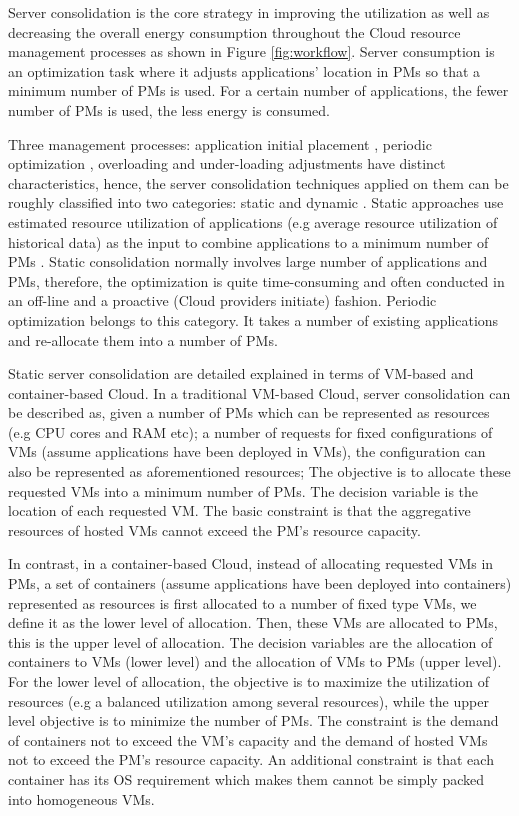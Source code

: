 Server consolidation \cite{Varasteh:2015fu} is the core strategy in improving the utilization as well as decreasing the overall energy consumption throughout the Cloud resource management processes as shown in Figure \ref{fig:workflow}. Server consumption is an optimization task where it adjusts applications' location in PMs so that a minimum number of PMs is used. For a certain number of applications, the fewer number of PMs is used, the less energy is consumed. 

Three management processes: application initial placement \cite{Jennings:2015ht}, periodic optimization \cite{Mishra:2012kx}, overloading and under-loading adjustments \cite{Mishra:2012kx} have distinct characteristics, hence, the server consolidation techniques applied on them can be roughly classified into two categories: static \cite{Xiao:2015ik} and dynamic \cite{Beloglazov:2012bw}.
Static approaches use estimated resource utilization of applications (e.g average resource utilization of historical data) as the input to combine applications to a minimum number of PMs \cite{Mishra:2012kx}. Static consolidation normally involves large number of applications and PMs, therefore, the optimization is quite time-consuming and often conducted in an off-line and a proactive (Cloud providers initiate) fashion. Periodic optimization belongs to this category. It takes a number of existing applications and re-allocate them into a number of PMs. 

Static server consolidation are detailed explained in terms of VM-based and container-based Cloud. In a traditional VM-based Cloud, server consolidation can be described as, given a number of  PMs which can be represented as resources (e.g CPU cores and RAM etc); a number of requests for fixed configurations of VMs (assume applications have been deployed in VMs), the configuration can also be represented as aforementioned resources; The objective is to allocate these requested VMs into a minimum number of PMs. The decision variable is the location of each requested VM. The basic constraint is that the aggregative resources  of hosted VMs cannot exceed the PM's resource capacity. 

In contrast, in a container-based Cloud, instead of allocating requested VMs in PMs, a set of containers (assume applications have been deployed into containers) represented as resources is first allocated to a number of fixed type VMs, we define it as the lower level of allocation. Then, these VMs are allocated to PMs, this is the upper level of allocation. The decision variables are the allocation of containers to VMs (lower level) and the allocation of VMs  to PMs (upper level). For the lower level of allocation, the objective is to maximize the utilization of resources (e.g a balanced utilization among several resources), while the upper level objective is to minimize the number of PMs. The constraint is the demand of containers not to exceed the VM's capacity and the demand of hosted VMs not to exceed the PM's resource capacity. An additional constraint is that each container has its OS requirement which makes them cannot be simply packed into homogeneous VMs. 

